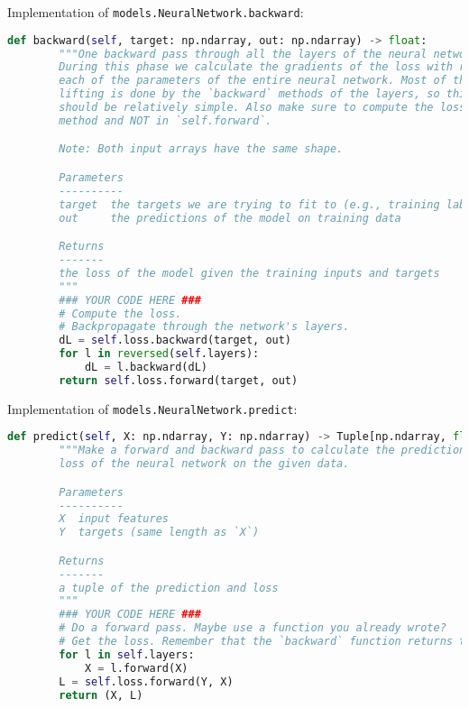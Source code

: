Implementation of \texttt{models.NeuralNetwork.backward}:

\begin{lstlisting}[language=Python]
    def backward(self, target: np.ndarray, out: np.ndarray) -> float:
        """One backward pass through all the layers of the neural network.
        During this phase we calculate the gradients of the loss with respect to
        each of the parameters of the entire neural network. Most of the heavy
        lifting is done by the `backward` methods of the layers, so this method
        should be relatively simple. Also make sure to compute the loss in this
        method and NOT in `self.forward`.

        Note: Both input arrays have the same shape.

        Parameters
        ----------
        target  the targets we are trying to fit to (e.g., training labels)
        out     the predictions of the model on training data

        Returns
        -------
        the loss of the model given the training inputs and targets
        """
        ### YOUR CODE HERE ###
        # Compute the loss.
        # Backpropagate through the network's layers.
        dL = self.loss.backward(target, out)
        for l in reversed(self.layers):
            dL = l.backward(dL)
        return self.loss.forward(target, out)

\end{lstlisting}

Implementation of \texttt{models.NeuralNetwork.predict}:

\begin{lstlisting}[language=Python]
    def predict(self, X: np.ndarray, Y: np.ndarray) -> Tuple[np.ndarray, float]:
        """Make a forward and backward pass to calculate the predictions and
        loss of the neural network on the given data.

        Parameters
        ----------
        X  input features
        Y  targets (same length as `X`)

        Returns
        -------
        a tuple of the prediction and loss
        """
        ### YOUR CODE HERE ###
        # Do a forward pass. Maybe use a function you already wrote?
        # Get the loss. Remember that the `backward` function returns the loss.
        for l in self.layers:
            X = l.forward(X)
        L = self.loss.forward(Y, X)
        return (X, L)

\end{lstlisting}

